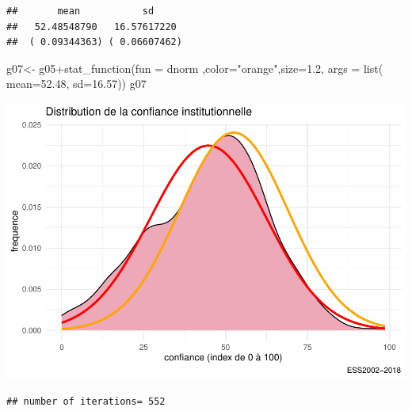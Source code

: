 \documentclass[
]{book}
\newenvironment{Shaded}{\begin{snugshade}}{\end{snugshade}}
\newcommand{\AttributeTok}[1]{\textcolor[rgb]{0.77,0.63,0.00}{#1}}
\newcommand{\DecValTok}[1]{\textcolor[rgb]{0.00,0.00,0.81}{#1}}
\newcommand{\FloatTok}[1]{\textcolor[rgb]{0.00,0.00,0.81}{#1}}
\newcommand{\FunctionTok}[1]{\textcolor[rgb]{0.00,0.00,0.00}{#1}}
\newcommand{\NormalTok}[1]{#1}
\newcommand{\OtherTok}[1]{\textcolor[rgb]{0.56,0.35,0.01}{#1}}
\newcommand{\SpecialCharTok}[1]{\textcolor[rgb]{0.00,0.00,0.00}{#1}}
\newcommand{\StringTok}[1]{\textcolor[rgb]{0.31,0.60,0.02}{#1}}
\begin{document}
\begin{verbatim}
##       mean           sd     
##   52.48548790   16.57617220 
##  ( 0.09344363) ( 0.06607462)
\end{verbatim}

\begin{Shaded}
\begin{Highlighting}[]
\NormalTok{g07}\OtherTok{\textless{}{-}}\NormalTok{ g05}\SpecialCharTok{+}\FunctionTok{stat\_function}\NormalTok{(}\AttributeTok{fun =}\NormalTok{  dnorm ,}\AttributeTok{color=}\StringTok{"orange"}\NormalTok{,}\AttributeTok{size=}\FloatTok{1.2}\NormalTok{, }\AttributeTok{args =} \FunctionTok{list}\NormalTok{( }\AttributeTok{mean=}\FloatTok{52.48}\NormalTok{,  }\AttributeTok{sd=}\FloatTok{16.57}\NormalTok{))}
\NormalTok{g07}
\end{Highlighting}
\end{Shaded}

\includegraphics{bookdown-demo_files/figure-latex/307-1.pdf}

\begin{Shaded}
\end{Shaded}

\begin{verbatim}
## number of iterations= 552
\end{verbatim}
\end{document}
